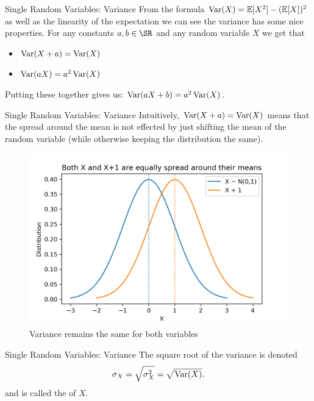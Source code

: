 \documentclass[notheorems,9pt, handout]{beamer}
\begin{document}
\begin{frame}{Single Random Variables: Variance} 
	\label{frame:srv-var2}
	\onslide<+->
	From the formula \(\operatorname{Var}(X) = \mathbb{E}[X^2]-(\mathbb{E}[X])^2\) as well as the linearity of the expectation we can see the variance has some nice properties. For any constants \(a,b \in \SR\) and any random variable \(X\) we get that
	\begin{itemize}
		\item \(\operatorname{Var}(X+a) = \operatorname{Var}(X)\)
		\item \(\operatorname{Var}(aX) = a^2\operatorname{Var}(X)\)
	\end{itemize}
	\onslide<+->
	Putting these together gives us: \(\operatorname{Var}(aX+b)= a^2\operatorname{Var}(X)\).
	
\end{frame}
\begin{frame}{Single Random Variables: Variance} 
	\label{frame:srv-var3}
	Intuitively, \(\operatorname{Var}(X+a) = \operatorname{Var}(X)\) means that the spread around the mean is not effected by just shifting the mean of the random variable (while otherwise keeping the distribution the same).
	\begin{figure}[htpb]
		\centering
		\includegraphics[width=0.7\linewidth]{X-dist.png}
		\caption{Variance remains the same for both variables}%
		\label{fig:X-dist}
	\end{figure}
\end{frame}
\begin{frame}{Single Random Variables: Variance} 
	\label{frame:srv-var4}
	\onslide<+->
	The square root of the variance is denoted 
	\[
	    \sigma_X = \sqrt{\sigma^2_X} = \sqrt{\operatorname{Var}(X)}
	.\] 
	and is called the  of \(X\).
\end{frame}
\end{document}
